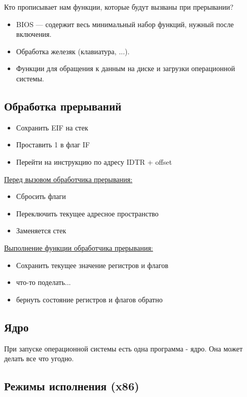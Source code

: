Кто прописывает нам функции, которые будут вызваны при прерывании?
\begin{itemize}
	\item BIOS --- содержит весь минимальный набор функций, нужный после включения.
	\item Обработка железяк (клавиатура, ...).
	\item Функции для обращения к данным на диске и загрузки операционной системы.
\end{itemize}

\subsection{Обработка прерываний}

\begin{itemize}
	\item Сохранить EIF на стек
	\item Проставить 1 в флаг IF
	\item Перейти на инструкцию по адресу IDTR + offset
\end{itemize}

\underline{Перед вызовом обработчика прерывания:}
\begin{itemize}
	\item Сбросить флаги
	\item Переключить текущее адресное пространство
	\item Заменяется стек
\end{itemize}

\underline{Выполнение функции обработчика прерывания:}
\begin{itemize}
	\item Сохранить текущее значение регистров и флагов
	\item что-то поделать...
	\item бернуть состояние регистров и флагов обратно
\end{itemize}

\subsection{Ядро}

При запуске операционной системы есть одна программа - ядро. Она может делать все что угодно.

\subsection{Режимы исполнения (x86)}


